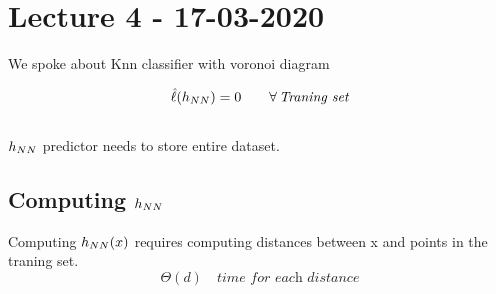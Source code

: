 \documentclass[../main.tex]{subfiles}
\begin{document}
\chapter{Lecture 4 - 17-03-2020}

We spoke about Knn classifier with voronoi diagram

$$
\hat{\ell}(h_{NN}) = 0 \qquad \forall \, \textit{Traning set}
$$
\\
$h_{NN}$ predictor needs to store entire dataset.
\\
\section{Computing $h_{NN}$}
Computing $h_{NN}(x)$ requires computing distances between x and points in the traning set.
\\
$$
\Theta(d) \quad \textit{time for each distance}
$$
\end{document}
